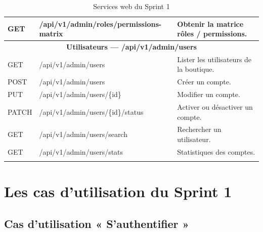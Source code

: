 \begin{longtable}{|p{1.8cm}|p{6.8cm}|p{6.2cm}|}
\hline
GET & /api/v1/admin/roles/permissions-matrix & Obtenir la matrice rôles / permissions. \\
\hline
\multicolumn{3}{|c|}{\textbf{Utilisateurs --- /api/v1/admin/users}} \\
\hline
GET & /api/v1/admin/users & Lister les utilisateurs de la boutique. \\
\hline
POST & /api/v1/admin/users & Créer un compte. \\
\hline
PUT & /api/v1/admin/users/\{id\} & Modifier un compte. \\
\hline
PATCH & /api/v1/admin/users/\{id\}/status & Activer ou désactiver un compte. \\
\hline
GET & /api/v1/admin/users/search & Rechercher un utilisateur. \\
\hline
GET & /api/v1/admin/users/stats & Statistiques des comptes. \\
\hline
\caption{Services web du Sprint 1}
\label{tab:ws-sprint1}
\end{longtable}

\section{Les cas d'utilisation du Sprint 1}
\subsection{Cas d'utilisation « S'authentifier »}

